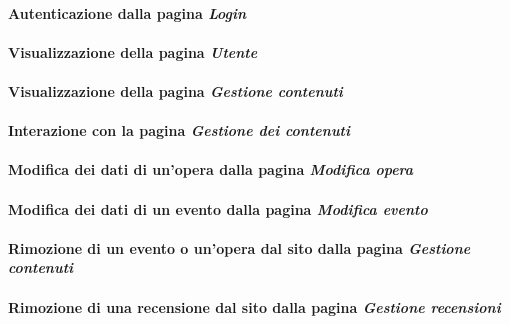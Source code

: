\paragraph{Autenticazione dalla pagina \textit{Login}}
\label{analisi-casi-uso-attori-principali-utente-amministratore-1}

\paragraph{Visualizzazione della pagina \textit{Utente}}
\label{analisi-casi-uso-attori-principali-utente-amministratore-2}

\paragraph{Visualizzazione della pagina \textit{Gestione contenuti}}
\label{analisi-casi-uso-attori-principali-utente-amministratore-3}

\paragraph{Interazione con la pagina \textit{Gestione dei contenuti}}
\label{analisi-casi-uso-attori-principali-utente-amministratore-4}

\paragraph{Modifica dei dati di un'opera dalla pagina \textit{Modifica opera}}
\label{analisi-casi-uso-attori-principali-utente-amministratore-5}

\paragraph{Modifica dei dati di un evento dalla pagina \textit{Modifica evento}}
\label{analisi-casi-uso-attori-principali-utente-amministratore-6}

\paragraph{Rimozione di un evento o un'opera dal sito dalla pagina \textit{Gestione contenuti}}
\label{analisi-casi-uso-attori-principali-utente-amministratore-7}

\paragraph{Rimozione di una recensione dal sito dalla pagina \textit{Gestione recensioni}}
\label{analisi-casi-uso-attori-principali-utente-amministratore-8}

